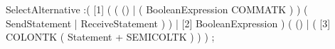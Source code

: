 %
%
%
\begin{rail}
SelectAlternative :( [1] ( ( () | ( BooleanExpression COMMATK ) )
                           ( SendStatement | ReceiveStatement )
                         )
                   | [2] BooleanExpression
                   )
                   ( () | ( [3] COLONTK ( Statement + SEMICOLTK ) ) )
                  ;
\end{rail}
